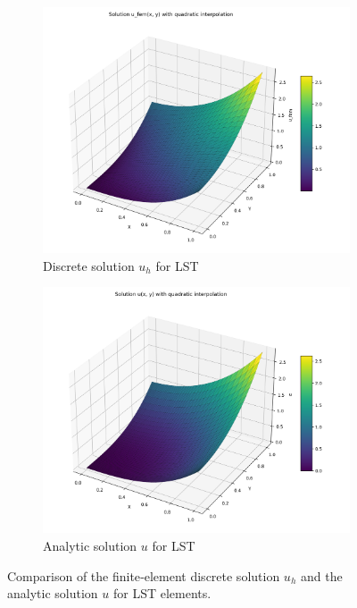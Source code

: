 \begin{figure}[H]
\centering
\begin{subfigure}[b]{0.48\textwidth}
    \centering
    \includegraphics[width=\textwidth]{GRAFICOS/LST/LST_u_fem_sol_surface_plot.png}
    \caption{Discrete solution \(u_h\) for LST}
    \label{fig:lst_u_fem_sol}
  \end{subfigure}
  \hfill
  \begin{subfigure}[b]{0.48\textwidth}
    \centering
    \includegraphics[width=\textwidth]{GRAFICOS/LST/LST_u_sol_surface_plot.png}
    \caption{Analytic solution \(u\) for LST}
    \label{fig:lst_error_plot}
  \end{subfigure}
  \caption{Comparison of the finite‐element discrete solution \(u_h\) and the analytic solution \(u\) for LST elements.}
  \label{fig:lst_comparison}
\end{figure}

